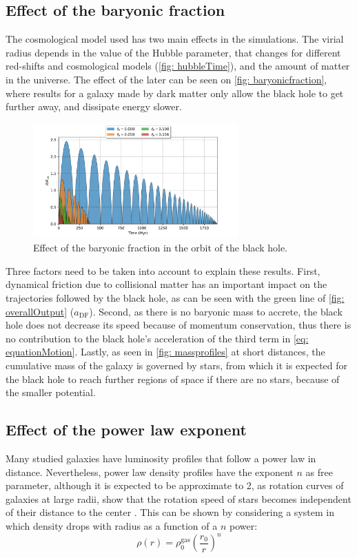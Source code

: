 	\subsection{Effect of the baryonic fraction}
	The cosmological model used has two main effects in the simulations. The virial radius depends in the value of the Hubble parameter, that changes for different red-shifts and cosmological models (\autoref{fig: hubbleTime}), and the amount of matter in the universe. The effect of the later can be seen on \autoref{fig: baryonicfraction}, where results for a galaxy made by dark matter only allow the black hole to get further away, and dissipate energy slower.
	\begin{figure}[h]
		\centering
		\includegraphics[width = 0.7\textwidth]{"../Files/Week 5/baryonic_fraction_comparison"}
		\caption{Effect of the baryonic fraction in the orbit of the black hole.}
		\label{fig: baryonicfraction}
	\end{figure}

	Three factors need to be taken into account to explain these results. First, dynamical friction due to collisional matter has an important impact on the trajectories followed by the black hole, as can be seen with the green line of \autoref{fig: overallOutput} ($a_\text{DF}$). Second, as there is no baryonic mass to accrete, the black hole does not decrease its speed because of momentum conservation, thus there is no contribution to the black hole's acceleration of the third term in \autoref{eq: equationMotion}. Lastly, as seen in \autoref{fig: massprofiles} at short distances, the cumulative mass of the galaxy is governed by stars, from which it is expected for the black hole to reach further regions of space if there are no stars, because of the smaller potential.
		
	\subsection{Effect of the power law exponent}	
		Many studied galaxies have luminosity profiles that follow a power law in distance. Nevertheless, power law density profiles have the exponent $n$ as free parameter, although it is expected to be approximate to 2, as rotation curves of galaxies at large radii, show that the rotation speed of stars becomes independent of their distance to the center \cite{binney2011galactic}. This can be shown by considering a system in which density drops with radius as a function of a $n$ power:
		\begin{equation}
			\rho(r) = \rho_0^\text{gas}\left(\dfrac{r_0}{r}\right)^n
		\end{equation}
		
